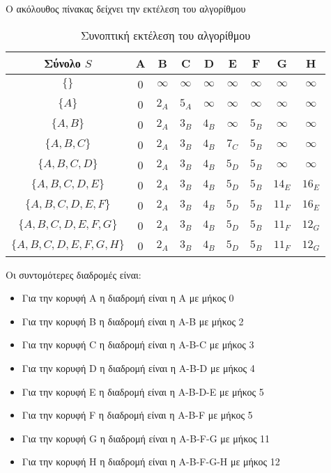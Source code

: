 Ο ακόλουθος πίνακας δείχνει την εκτέλεση του αλγορίθμου
\begin{table}[ht!]
	\centering
	\label{tbl:dijkstra3}
	\begin{tabular}{|c|c|c|c|c|c|c|c|c|}
		\hline
		Σύνολο $S$            & A & B        & C        & D        & E        & F        & G        & H         \\ \hline
		$\{\}$                & 0 & $\infty$ & $\infty$ & $\infty$ & $\infty$ & $\infty$ & $\infty$ & $\infty$  \\ \hline
		$\{A\}$               & 0 & $2_A$    & $5_A$    & $\infty$ & $\infty$ & $\infty$ & $\infty$ & $\infty$  \\ \hline
		$\{A,B\}$             & 0 & $2_A$    & $3_B$    & $4_B$ & $\infty$ & $5_B$    & $\infty$ & $\infty$  \\ \hline
		$\{A,B,C\}$           & 0 & $2_A$    & $3_B$    & $4_B$    & $7_C$    & $5_B$    & $\infty$ & $\infty$  \\ \hline
		$\{A,B,C,D\}$         & 0 & $2_A$    & $3_B$    & $4_B$    & $5_D$    & $5_B$    & $\infty$ & $\infty$  \\ \hline
		$\{A,B,C,D,E\}$       & 0 & $2_A$    & $3_B$    & $4_B$    & $5_D$    & $5_B$    & $14_E$   & $16_E$    \\ \hline			
		$\{A,B,C,D,E,F\}$     & 0 & $2_A$    & $3_B$    & $4_B$    & $5_D$    & $5_B$    & $11_F$   & $16_E$    \\ \hline			
		$\{A,B,C,D,E,F,G\}$    & 0 & $2_A$    & $3_B$    & $4_B$    & $5_D$    & $5_B$    & $11_F$   & $12_G$    \\ \hline			
		$\{A,B,C,D,E,F,G,H\}$ & 0 & $2_A$    & $3_B$    & $4_B$    & $5_D$    & $5_B$    & $11_F$   & $12_G$    \\ \hline
	\end{tabular}
	\caption{Συνοπτική εκτέλεση του αλγορίθμου}
\end{table}


Οι συντομότερες διαδρομές είναι:
\begin{itemize}[noitemsep]
\item Για την κορυφή A η διαδρομή είναι η A με μήκος 0
\item Για την κορυφή B η διαδρομή είναι η A-B με μήκος 2
\item Για την κορυφή C η διαδρομή είναι η A-B-C με μήκος 3
\item Για την κορυφή D η διαδρομή είναι η A-B-D με μήκος 4
\item Για την κορυφή E η διαδρομή είναι η A-B-D-E με μήκος 5
\item Για την κορυφή F η διαδρομή είναι η A-B-F με μήκος 5
\item Για την κορυφή G η διαδρομή είναι η A-B-F-G με μήκος 11
\item Για την κορυφή H η διαδρομή είναι η A-B-F-G-H με μήκος 12
\end{itemize}


